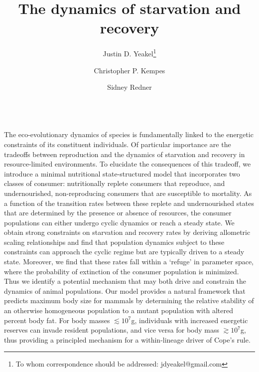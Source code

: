 \documentclass[11pt]{article}
\title{The dynamics of starvation and recovery}%
\author[1,2]{Justin D. Yeakel\thanks{To whom correspondence should be addressed: jdyeakel@gmail.com}}
\author[2]{Christopher P. Kempes}
\author[2,3]{Sidney Redner}
\affil[1]{School of Natural Sciences, UC Merced, Merced, CA}
\affil[2]{The Santa Fe Institute, Santa Fe, NM}
\affil[3]{Department of Physics, Boston University, Boston, MA}
\date{}
\begin{document}
\maketitle


	


 \\ %
The eco-evolutionary dynamics of species is fundamentally linked to the energetic constraints of its constituent individuals.  
Of particular importance are the tradeoffs between reproduction and the dynamics of starvation and recovery in resource-limited environments.  
To elucidate the consequences of this tradeoff, we introduce a minimal nutritional state-structured model that incorporates two classes of consumer: nutritionally replete consumers that reproduce, and undernourished, non-reproducing consumers that are susceptible to mortality.  
As a function of the transition rates between these replete and undernourished states that are determined by the presence or absence of resources, the consumer populations can either undergo cyclic dynamics or reach a steady state.  
We obtain strong constraints on starvation and recovery rates by deriving allometric scaling relationships and find that population dynamics subject to these constraints can approach the cyclic regime but are typically driven to a steady state.  
Moreover, we find that these rates fall within a `refuge' in parameter space, where the probability of extinction of the consumer population is minimized.  
Thus we identify a potential mechanism that may both drive and constrain the dynamics of animal populations.  
Our model provides a natural framework that predicts maximum body size for mammals by determining the relative stability of an otherwise homogeneous population to a mutant population with altered percent body fat.  
For body masses $\lesssim 10^7$g, individuals with increased energetic reserves can invade resident populations, and vice versa for body mass $\gtrsim 10^7$g, thus providing a principled mechanism for a within-lineage driver of Cope's rule.

\end{document}
